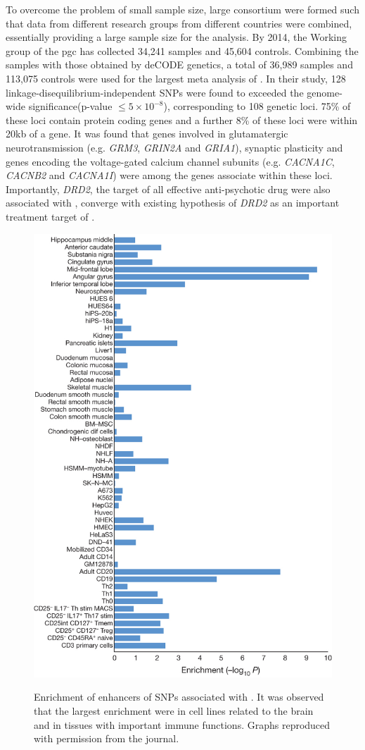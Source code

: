 \documentclass[12pt]{book}
\newcommand*{\glng}{\glsentrylong}
\newcommand*{\Glng}{\Glsentrylong}
\begin{document}
	To overcome the problem of small sample size, large consortium were formed such that data from different research groups from different countries were combined, essentially providing a large sample size for the analysis.
	By 2014, the \Glng{scz} Working group of the \gls{pgc} has collected 34,241 \glng{scz} samples and 45,604 controls\citep{Ripke2014}.
	Combining the samples with those obtained by deCODE genetics, a total of 36,989 \glng{scz} samples and 113,075 controls were used for the largest meta analysis of \glng{scz}.
	In their study\citep{Ripke2014}, 128 linkage-disequilibrium-independent \glspl{SNP} were found to  exceeded the genome-wide significance(p-value $\le 5\times10^{-8}$), corresponding to 108 genetic loci.
	75\% of these loci contain protein coding genes and a further 8\% of these loci were within 20kb of a gene. 
	It was found that genes involved in glutamatergic neurotransmission (e.g. \textit{GRM3}, \textit{GRIN2A} and \textit{GRIA1}), synaptic plasticity and genes encoding the voltage-gated calcium channel subunits (e.g. \textit{CACNA1C}, \textit{CACNB2} and \textit{CACNA1I}) were among the genes associate within these loci.
	Importantly, \textit{DRD2}, the target of all effective anti-psychotic drug were also associated with \glng{scz}, converge with existing hypothesis of \textit{DRD2} as an important treatment target of \glng{scz}.
	\begin{figure}
		\centering
		\caption[Enrichment of enhancers of SNPs associated with Schizophrenia]{Enrichment of enhancers of SNPs associated with \glng{scz}. 
			It was observed that the largest enrichment were in cell lines related to the brain and in tissues with important immune functions. 
			Graphs reproduced with permission from the journal.\citep{Ripke2014}}
		\includegraphics[height=\textwidth]{figure/pgc_enrichment_tissue.jpg}
		\label{fig:pgcEnrich}
	\end{figure}
\end{document}
